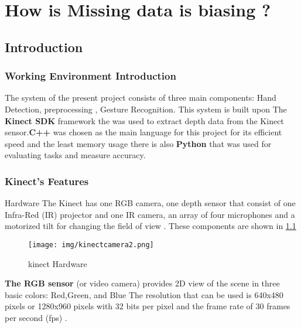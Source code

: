 

\chapter{How is Missing data is biasing ?}

\section{Introduction}\label{sec:kinect}



\subsection{Working  Environment  Introduction }
The system of the present project  consists of three main components:  Hand Detection, preprocessing ,  Gesture Recognition.  This system is built upon  The \textbf{Kinect SDK}  framework the was  used to extract  depth data  from the Kinect sensor.\textbf{C++} was chosen as the main language for this project for its efficient speed and the least memory usage  there is also \textbf{Python} that was used for  evaluating tasks and measure accuracy.


\subsection{Kinect's Features }

Hardware The Kinect has one RGB camera, one depth sensor that consist of one Infra-Red (IR) projector and one IR camera, an array of four microphones and a motorized tilt for changing the field of view \cite{kinect15}. These components are shown in \ref{fig:cam2}

\begin{figure}[H]
\centering
\texttt{[image: img/kinectcamera2.png]}
\caption{ kinect Hardware }
\label{fig:cam2}
\end{figure}

\textbf{The RGB sensor}  (or video camera) provides 2D view of the scene in three basic colors: Red,Green, and Blue \cite{kinect15} The resolution that can be used is 640x480 pixels or 1280x960 pixels with 32 bits per pixel and the frame rate of 30 frames per second (fps) \cite{kinect15}. \\

